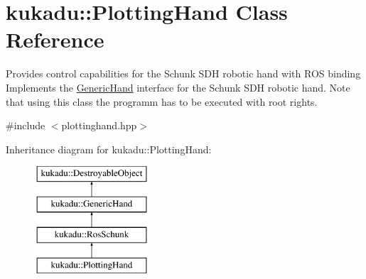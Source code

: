 \hypertarget{classkukadu_1_1PlottingHand}{\section{kukadu\-:\-:Plotting\-Hand Class Reference}
\label{classkukadu_1_1PlottingHand}
}


Provides control capabilities for the Schunk S\-D\-H robotic hand with R\-O\-S binding Implements the \hyperlink{classkukadu_1_1GenericHand}{Generic\-Hand} interface for the Schunk S\-D\-H robotic hand. Note that using this class the programm has to be executed with root rights.  




{\ttfamily \#include $<$plottinghand.\-hpp$>$}

Inheritance diagram for kukadu\-:\-:Plotting\-Hand\-:\begin{figure}[H]
\begin{center}
\leavevmode
\includegraphics[height=4.000000cm]{classkukadu_1_1PlottingHand}
\end{center}
\end{figure}
